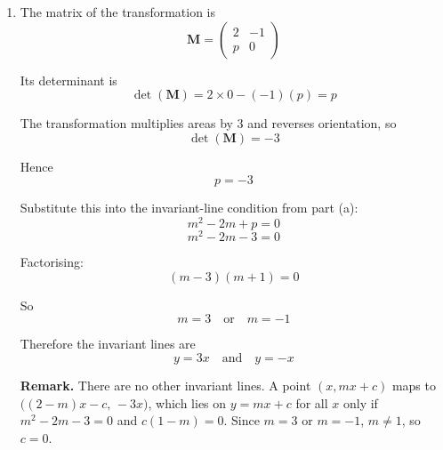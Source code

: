 \documentclass[leqno]{article}
\begin{document}
\begin{enumerate}[
  label=\textbf{\arabic*.},
  leftmargin=*,
  topsep=0pt,
  partopsep=0pt,
  parsep=0pt
]
\begin{djsSolution}
\begin{enumerate}[label=\textbf{(\alph*)}]
  as required.

  The transformation has no invariant lines through the origin when this quadratic has no real solutions for $m$.

  Its discriminant is
  \[
  (-2)^2-4(1)(p)=4-4p
  \]

  For no real roots:
  \[
  4-4p<0
  \]
  \[
  1-p<0
  \]
  \[
  p>1
  \]

  Therefore the transformation has no invariant lines through the origin when $p>1$.

  \item The matrix of the transformation is
  \[
  \mathbf{M}=\begin{pmatrix}2&-1\\ p&0\end{pmatrix}
  \]

  Its determinant is
  \[
  \det(\mathbf{M})=2\times 0-(-1)(p)=p
  \]

  The transformation multiplies areas by $3$ and reverses orientation, so
  \[
  \det(\mathbf{M})=-3
  \]

  Hence
  \[
  p=-3
  \]

  Substitute this into the invariant-line condition from part (a):
  \[
  m^2-2m+p=0
  \]
  \[
  m^2-2m-3=0
  \]

  Factorising:
  \[
  (m-3)(m+1)=0
  \]

  So
  \[
  m=3 \quad \text{or} \quad m=-1
  \]

  Therefore the invariant lines are
  \[
  y=3x \quad \text{and} \quad y=-x
  \]

  \textbf{Remark.} There are no other invariant lines. A point $(x,mx+c)$ maps to $\bigl((2-m)x-c,\,-3x\bigr)$, which lies on $y=mx+c$ for all $x$ only if $m^2-2m-3=0$ and $c(1-m)=0$. Since $m=3$ or $m=-1$, $m\neq1$, so $c=0$.
\end{enumerate}
\end{djsSolution}


\newpage

\questionitem


\end{enumerate}
\end{document}
